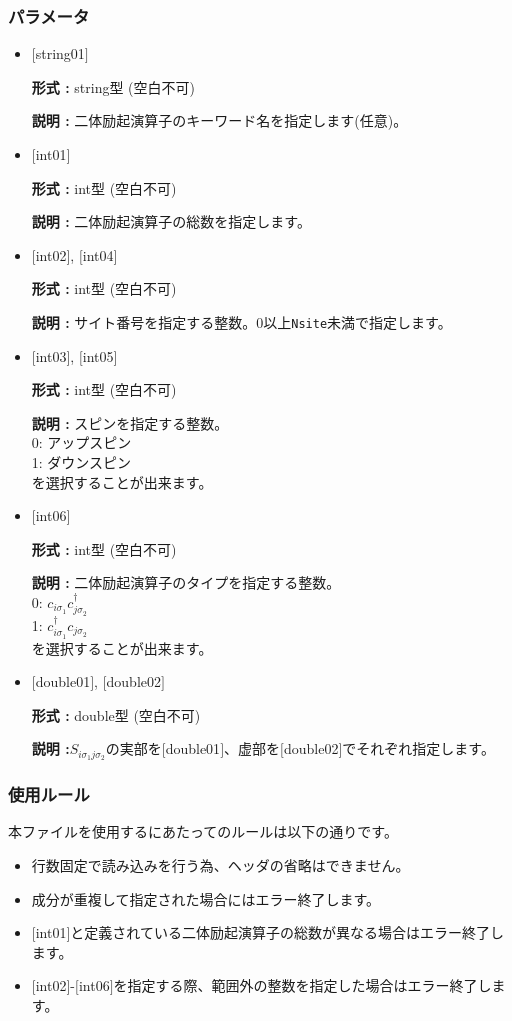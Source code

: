 \subsubsection{パラメータ}
 \begin{itemize}

   \item  $[$string01$]$
   
    {\bf 形式 :} string型 (空白不可)

   {\bf 説明 :} 二体励起演算子のキーワード名を指定します(任意)。

   \item  $[$int01$]$
   
    {\bf 形式 :} int型 (空白不可)

   {\bf 説明 :} 二体励起演算子の総数を指定します。

  \item  $[$int02$]$, $[$int04$]$

 {\bf 形式 :} int型 (空白不可)

{\bf 説明 :} サイト番号を指定する整数。0以上\verb|Nsite|{未満}で指定します。
 
  \item  $[$int03$]$, $[$int05$]$

 {\bf 形式 :} int型 (空白不可)

{\bf 説明 :} スピンを指定する整数。\\
0: アップスピン\\
1: ダウンスピン\\
を選択することが出来ます。

\item  $[$int06$]$

 {\bf 形式 :} int型 (空白不可)

{\bf 説明 :} 二体励起演算子のタイプを指定する整数。\\
0: $ c_{i\sigma_1}c_{j\sigma_2}^{\dagger}$\\
1: $ c_{i\sigma_1}^{\dagger}c_{j\sigma_2}$\\
を選択することが出来ます。

\item  $[$double01$]$, $[$double02$]$

 {\bf 形式 :} double型 (空白不可)

{\bf 説明 :}$S_{i\sigma_1j\sigma_2}$の実部を$[$double01$]$、虚部を$[$double02$]$でそれぞれ指定します。

\end{itemize}

\subsubsection{使用ルール}
本ファイルを使用するにあたってのルールは以下の通りです。
\begin{itemize}
\item 行数固定で読み込みを行う為、ヘッダの省略はできません。
\item 成分が重複して指定された場合にはエラー終了します。
\item $[$int01$]$と定義されている二体励起演算子の総数が異なる場合はエラー終了します。
\item $[$int02$]$-$[$int06$]$を指定する際、範囲外の整数を指定した場合はエラー終了します。
\end{itemize}

